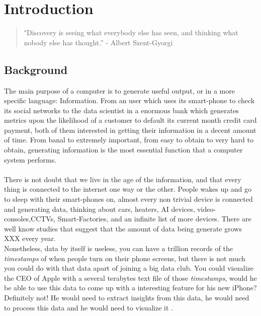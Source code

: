 \section{Introduction}

\begin{verse} "Discovery is seeing what everybody else has seen, and thinking
what nobody else has thought.” - Albert Szent-Gyorgi \end{verse}

\subsection{Background} The main purpose of a computer is to generate useful
output, or in a more specific language: Information. From an user which uses its
smart-phone to check its social networks to the data scientist in a enormous
bank which generates metrics upon the likelihood of a customer to default its
current month credit card payment, both of them interested in getting their
information in a decent amount of time. From banal to extremely important, from
easy to obtain to very hard to obtain, generating information is the most
essential function that a computer system performs. \\ \\

There is not doubt that we live in the age of the information, and that every
thing is connected to the internet one way or the other. People wakes up and go
to sleep with their smart-phones on, almost every non trivial device is
connected and generating data, thinking about cars, heaters, AI devices,
video-consoles,CCTVs, Smart-Factories, and an infinite list of more devices.
There are well know studies that suggest that the amount of data being generate
grows XXX every year. \\ 

Nonetheless, data by itself is useless, you can have a trillion records of the
\textit{timestamps} of when people turn on their phone screens, but there is not
much you could do with that data apart of joining a big data club. You could
visualize the CEO of Apple with a several terabytes text file of those
\textit{timestamps}, would he be able to use this data to come up with a
interesting feature for his new iPhone? Definitely not! He would need to extract
insights from this data, he would need to process this data and he would need to
visualize it \-. \\ \\

